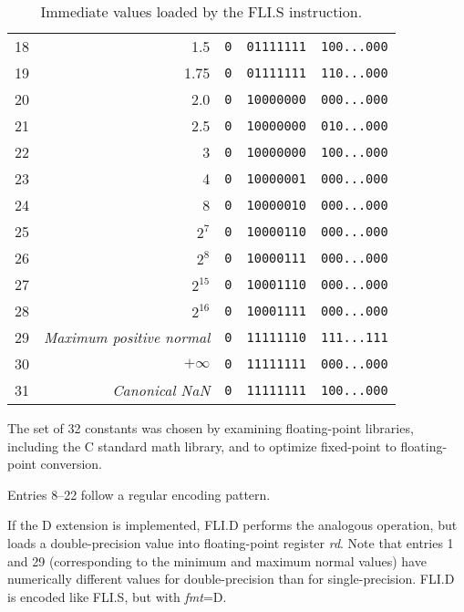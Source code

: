\begin{table}[h]
\begin{tabular}{|r|r|c|c|c|}
18          & 1.5                              & {\tt 0} & {\tt 01111111} & {\tt 100...000} \\
19          & 1.75                             & {\tt 0} & {\tt 01111111} & {\tt 110...000} \\
20          & 2.0                              & {\tt 0} & {\tt 10000000} & {\tt 000...000} \\
21          & 2.5                              & {\tt 0} & {\tt 10000000} & {\tt 010...000} \\
22          & 3                                & {\tt 0} & {\tt 10000000} & {\tt 100...000} \\
23          & 4                                & {\tt 0} & {\tt 10000001} & {\tt 000...000} \\
24          & 8                                & {\tt 0} & {\tt 10000010} & {\tt 000...000} \\
25          & $2^7$                            & {\tt 0} & {\tt 10000110} & {\tt 000...000} \\
26          & $2^8$                            & {\tt 0} & {\tt 10000111} & {\tt 000...000} \\
27          & $2^{15}$                         & {\tt 0} & {\tt 10001110} & {\tt 000...000} \\
28          & $2^{16}$                         & {\tt 0} & {\tt 10001111} & {\tt 000...000} \\
29          & {\em Maximum positive normal}    & {\tt 0} & {\tt 11111110} & {\tt 111...111} \\
30          & $+\infty$                        & {\tt 0} & {\tt 11111111} & {\tt 000...000} \\
31          & {\em Canonical NaN}              & {\tt 0} & {\tt 11111111} & {\tt 100...000} \\
\hline
\end{tabular}
\caption{Immediate values loaded by the FLI.S instruction.}
\label{tab:flis}
\end{table}

\begin{commentary}
The set of 32 constants was chosen by examining floating-point libraries,
including the C standard math library, and to optimize fixed-point to
floating-point conversion.

Entries 8--22 follow a regular encoding pattern.
\end{commentary}

If the D extension is implemented, FLI.D performs the analogous operation,
but loads a double-precision value into floating-point register {\em rd}.
Note that entries 1 and 29 (corresponding to the minimum and maximum
normal values) have numerically different values for double-precision than
for single-precision.
FLI.D is encoded like FLI.S, but with {\em fmt}=D.


